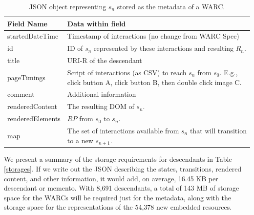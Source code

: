 \documentclass{sig-alternate}
\begin{document}
\begin{table}
\centering
\begin{tabular}{l | p{5cm}}
\textbf{Field Name} & \textbf{Data within field} \\
\hline
\hline
startedDateTime & Timestamp of interactions (no change from WARC Spec)\\
\hline
id & ID of $s_n$ represented by these interactions and resulting $R_n$.\\
\hline
title & URI-R of the descendant\\
\hline
pageTimings & Script of interactions (as CSV) to reach $s_n$ from $s_0$. E.g., click button A, click button B, then double click image C.\\
\hline
comment & Additional information \\
\hline
renderedContent & The resulting DOM of $s_n$.\\
\hline
renderedElements & $RP$ from $s_0$ to $s_n$.\\
\hline
map & The set of interactions available from $s_n$ that will transition to a new $s_{n+1}$.\\
\hline
\end{tabular}
  \caption{JSON object representing $s_n$ stored as the metadata of a WARC.}
  \label{fields}
\end{table}


We present a summary of the storage requirements for descendants in Table \ref{storages}. If we write out the JSON describing the states, transitions, rendered content, and other information, it would add, on average, 16.45 KB per descendant or memento. With 8,691 descendants, a total of 143 MB of storage space for the WARCs will be required just for the metadata, along with the storage space for the representations of the 54,378 new embedded resources. 
\end{document}
